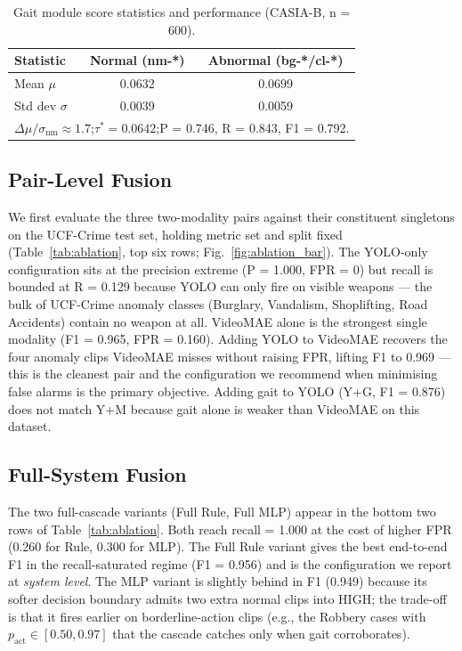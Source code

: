 \documentclass[runningheads]{llncs}
\begin{document}
\begin{algorithm}[!htbp]
\begin{table}[!htbp]
\caption{Gait module score statistics and performance (CASIA-B, n = 600).}
\label{tab:gait}
\centering
\begin{tabular}{lcc}
\toprule
\textbf{Statistic} & \textbf{Normal (nm-*)} & \textbf{Abnormal (bg-*/cl-*)}\\
\midrule
Mean $\mu$       & 0.0632 & 0.0699\\
Std dev $\sigma$ & 0.0039 & 0.0059\\
\midrule
\multicolumn{3}{l}{$\Delta\mu / \sigma_\text{nm} \approx 1.7$;\quad $\tau^* = 0.0642$;\quad P = 0.746, R = 0.843, F1 = 0.792.}\\
\bottomrule
\end{tabular}
\end{table}

\subsection{Pair-Level Fusion}\label{sec:pair-fusion}

We first evaluate the three two-modality pairs against their constituent singletons on the UCF-Crime test set, holding metric set and split fixed (Table~\ref{tab:ablation}, top six rows; Fig.~\ref{fig:ablation_bar}). The YOLO-only configuration sits at the precision extreme (P = 1.000, FPR = 0) but recall is bounded at R = 0.129 because YOLO can only fire on visible weapons --- the bulk of UCF-Crime anomaly classes (Burglary, Vandalism, Shoplifting, Road Accidents) contain no weapon at all. VideoMAE alone is the strongest single modality (F1 = 0.965, FPR = 0.160). Adding YOLO to VideoMAE recovers the four anomaly clips VideoMAE misses without raising FPR, lifting F1 to 0.969 --- this is the cleanest pair and the configuration we recommend when minimising false alarms is the primary objective. Adding gait to YOLO (Y+G, F1 = 0.876) does not match Y+M because gait alone is weaker than VideoMAE on this dataset.

\subsection{Full-System Fusion}\label{sec:full-system}

The two full-cascade variants (Full Rule, Full MLP) appear in the bottom two rows of Table~\ref{tab:ablation}. Both reach recall = 1.000 at the cost of higher FPR (0.260 for Rule, 0.300 for MLP). The Full Rule variant gives the best end-to-end F1 in the recall-saturated regime (F1 = 0.956) and is the configuration we report at \emph{system level}. The MLP variant is slightly behind in F1 (0.949) because its softer decision boundary admits two extra normal clips into HIGH; the trade-off is that it fires earlier on borderline-action clips (e.g., the Robbery cases with $p_\text{act} \in [0.50, 0.97]$ that the cascade catches only when gait corroborates).


\end{algorithm}
\end{document}
